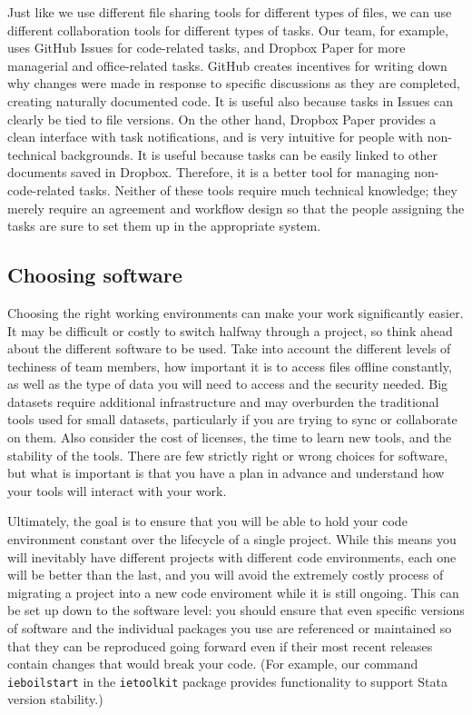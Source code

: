 Just like we use different file sharing tools for different types of files,
we can use different collaboration tools for different types of tasks.
Our team, for example, uses GitHub Issues for code-related tasks,
and Dropbox Paper for more managerial and office-related tasks.
GitHub creates incentives for writing down why changes were made
in response to specific discussions
as they are completed, creating naturally documented code.
It is useful also because tasks in Issues can clearly be tied to file versions.
On the other hand, Dropbox Paper provides a clean interface with task notifications,
and is very intuitive for people with non-technical backgrounds.
It is useful because tasks can be easily linked to other documents saved in Dropbox.
Therefore, it is a better tool for managing non-code-related tasks.
Neither of these tools require much technical knowledge;
they merely require an agreement and workflow design
so that the people assigning the tasks are sure to set them up in the appropriate system.

\subsection{Choosing software}

Choosing the right working environments can make your work significantly easier.
It may be difficult or costly to switch halfway through a project, so
think ahead about the different software to be used.
Take into account the different levels of techiness of team members,
how important it is to access files offline constantly,
as well as the type of data you will need to access and the security needed.
Big datasets require additional infrastructure and may overburden
the traditional tools used for small datasets,
particularly if you are trying to sync or collaborate on them.
Also consider the cost of licenses, the time to learn new tools,
and the stability of the tools.
There are few strictly right or wrong choices for software,
but what is important is that you have a plan in advance
and understand how your tools will interact with your work.

Ultimately, the goal is to ensure that you will be able to hold
your code environment constant over the lifecycle of a single project.
While this means you will inevitably have different projects
with different code environments, each one will be better than the last,
and you will avoid the extremely costly process of migrating a project
into a new code enviroment while it is still ongoing.
This can be set up down to the software level:
you should ensure that even specific versions of software
and the individual packages you use
are referenced or maintained so that they can be reproduced going forward
even if their most recent releases contain changes that would break your code.
(For example, our command \texttt{ieboilstart} in the \texttt{ietoolkit} package
provides functionality to support Stata version stability.)

